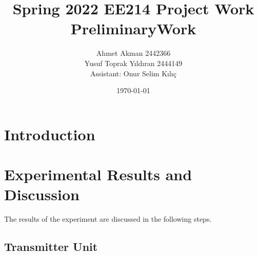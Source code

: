 \documentclass[letterpaper,12pt]{article}
\begin{document}
\thispagestyle{empty}

\title{Spring 2022 EE214 Project Work  \protect\\ PreliminaryWork }
\author{Ahmet Akman 2442366 \protect\\ Yusuf Toprak Yıldıran 2444149 \protect\\ Assistant: Onur Selim Kılıç}
\date{\today}
\maketitle
\tableofcontents
\section{Introduction}
\section{Experimental Results and Discussion}
The results of the experiment are discussed in the following steps.
%
\subsection{Transmitter Unit}
\end{document}
